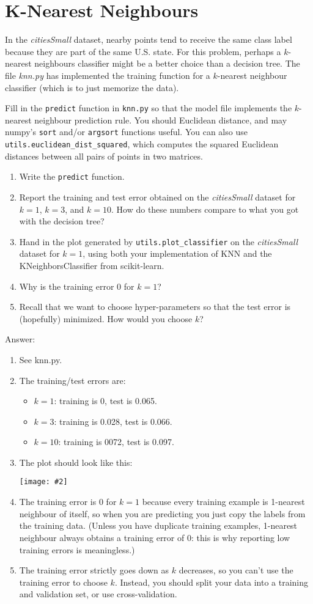 \documentclass{article}
\def\ans#1{\par\gre{Answer: #1}}
\def\answer#1{\ans{#1}}
\def\blu#1{{\color{blu}#1}}
\def\gre#1{{\color{gre}#1}}
\newcommand{\centerfig}[2]{\begin{center}\texttt{[image: \#2]}\end{center}}
\def\items#1{\begin{itemize}#1\end{itemize}}
\def\enum#1{\begin{enumerate}#1\end{enumerate}}
\begin{document}
	\section{K-Nearest Neighbours}
	
	In the \emph{citiesSmall} dataset, nearby points tend to receive the same class label because they are part of the same U.S. state. For this problem, perhaps a $k$-nearest neighbours classifier might be a better choice than a decision tree. The file \emph{knn.py} has implemented the training function for a $k$-nearest neighbour classifier (which is to just memorize the data).
	
	
	Fill in the \texttt{predict} function in \texttt{knn.py} so that the model file implements the $k$-nearest neighbour prediction rule.
	You should Euclidean distance, and may numpy's \texttt{sort} and/or \texttt{argsort} functions useful.
	You can also use \texttt{utils.euclidean\string_dist\string_squared}, which computes the squared Euclidean distances between all pairs of points in two matrices.
	\blu{
		\enum{
			\item Write the \texttt{predict} function.
			\item Report  the training and test error obtained on the \emph{citiesSmall} dataset for $k=1$, $k=3$, and $k=10$. How do these numbers compare to what you got with the decision tree?
			\item Hand in the plot generated by \texttt{utils.plot\_classifier} on the \emph{citiesSmall} dataset for $k=1$, using both your implementation of KNN and the KNeighborsClassifier from scikit-learn.
			\item Why is the training error $0$ for $k=1$?
			\item Recall that we want to choose hyper-parameters so that the test error is (hopefully) minimized. How would you choose $k$?
	}}
	
	\answer{
		\enum{
			\item See knn.py.
			\item The training/test errors are:
			\items{
				\item $k=1$: training is 0, test is 0.065.
				\item $k=3$: training is 0.028, test is 0.066.
				\item $k=10$: training is 0072, test is 0.097.
			}
			\item The plot should look like this:
			\centerfig{.7}{../figs/knnDecisionBoundary.pdf}
			\item The training error is $0$ for $k=1$ because every training example is 1-nearest neighbour of itself, so when you are predicting you just copy the labels from the training data. (Unless you have duplicate training examples, 1-nearest neighbour always obtains a training error of 0: this is why reporting low training errors is meaningless.)
			\item The training error strictly goes down as $k$ decreases, so you can't use the training error to choose $k$. Instead, you should split your data into a training and validation set, or use cross-validation.
		}
	}
	
\end{document}
